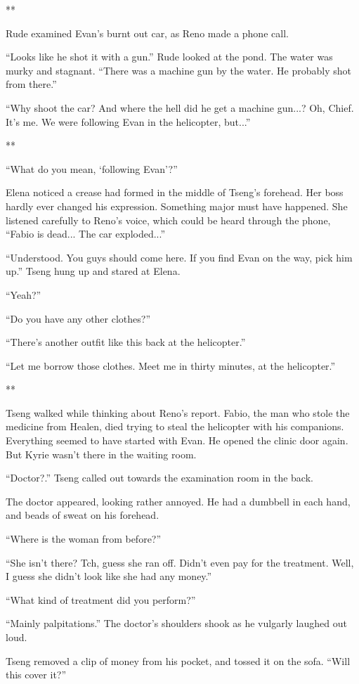 \documentclass[oneside]{book}
\begin{document}
**

Rude examined Evan’s burnt out car, as Reno made a phone call.

“Looks like he shot it with a gun.” Rude looked at the pond. The water was murky and stagnant. “There was a machine gun by the water. He probably shot from there.”

“Why shoot the car? And where the hell did he get a machine gun...? Oh, Chief. It’s me. We were following Evan in the helicopter, but...”

**

“What do you mean, ‘following Evan’?”

Elena noticed a crease had formed in the middle of Tseng’s forehead. Her boss hardly ever changed his expression. Something major must have happened. She listened carefully to Reno’s voice, which could be heard through the phone, “Fabio is dead... The car exploded...”

“Understood. You guys should come here. If you find Evan on the way, pick him up.” Tseng hung up and stared at Elena.

“Yeah?”

“Do you have any other clothes?”

“There’s another outfit like this back at the helicopter.”

“Let me borrow those clothes. Meet me in thirty minutes, at the helicopter.”

**

Tseng walked while thinking about Reno’s report. Fabio, the man who stole the medicine from Healen, died trying to steal the helicopter with his companions. Everything seemed to have started with Evan. He opened the clinic door again. But Kyrie wasn’t there in the waiting room.

“Doctor?.” Tseng called out towards the examination room in the back.

The doctor appeared, looking rather annoyed. He had a dumbbell in each hand, and beads of sweat on his forehead.

“Where is the woman from before?”

“She isn’t there? Tch, guess she ran off. Didn’t even pay for the treatment. Well, I guess she didn’t look like she had any money.”

“What kind of treatment did you perform?”

“Mainly palpitations.” The doctor’s shoulders shook as he vulgarly laughed out loud.

Tseng removed a clip of money from his pocket, and tossed it on the sofa. “Will this cover it?”
\end{document}
